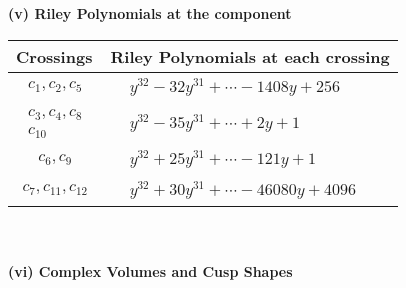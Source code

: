 \documentclass[1p]{elsarticle_modified}
\theoremstyle{definition}
\begin{document}
\newpage\renewcommand{\arraystretch}{1}
\flushleft \textbf{(v) Riley Polynomials at the component}\newline \\
\begin{tabular}{m{50pt}|m{274pt}}
Crossings & \hspace{64pt}Riley Polynomials at each crossing \\
\hline $$\begin{aligned}c_{1},c_{2},c_{5}\end{aligned}$$&$\begin{aligned}
&y^{32}-32 y^{31}+\cdots-1408 y+256
\end{aligned}$\\
\hline $$\begin{aligned}c_{3},c_{4},c_{8}\\c_{10}\end{aligned}$$&$\begin{aligned}
&y^{32}-35 y^{31}+\cdots+2 y+1
\end{aligned}$\\
\hline $$\begin{aligned}c_{6},c_{9}\end{aligned}$$&$\begin{aligned}
&y^{32}+25 y^{31}+\cdots-121 y+1
\end{aligned}$\\
\hline $$\begin{aligned}c_{7},c_{11},c_{12}\end{aligned}$$&$\begin{aligned}
&y^{32}+30 y^{31}+\cdots-46080 y+4096
\end{aligned}$\\
\hline
\end{tabular}\\~\\
\newpage\flushleft \textbf{(vi) Complex Volumes and Cusp Shapes}
\end{document}
